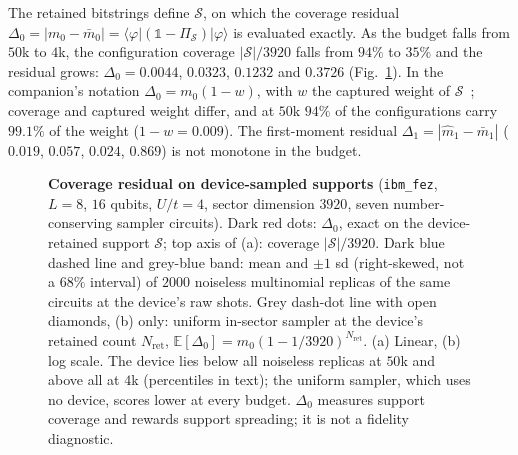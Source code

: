 \documentclass[submission, PhysCore]{SciPost}
\newcommand{\openone}{\mathds{1}}%
\newcommand{\onecolfig}{\setlength{\columnwidth}{0.65\textwidth}}
\begin{document}
The retained bitstrings define $\mathcal S$, on which the coverage residual $\Delta_0=|m_0-\bar m_0|={\langle\varphi|(\openone-\Pi_\mathcal S)|\varphi\rangle}$ is evaluated exactly. As the budget falls from $50$k to $4$k, the configuration coverage $|\mathcal S|/3920$ falls from $94\%$ to $35\%$ and the residual grows: $\Delta_0=0.0044$, $0.0323$, $0.1232$ and $0.3726$ (Fig.~\ref{fig:device}). In the companion's notation $\Delta_0=m_0(1-w)$, with $w$ the captured weight of $\mathcal S$~\cite{SQDspec2608}; coverage and captured weight differ, and at $50$k $94\%$ of the configurations carry $99.1\%$ of the weight ($1-w=0.009$). The first-moment residual $\Delta_1=|\widehat m_1-\bar m_1|$ ($0.019$, $0.057$, $0.024$, $0.869$) is not monotone in the budget.

\begin{figure}[tb]
\centering\onecolfig

\caption{\textbf{Coverage residual on device-sampled supports} (\texttt{ibm\_fez}, $L=8$, $16$ qubits, $U/t=4$, sector dimension $3920$, seven number-conserving sampler circuits). Dark red dots: $\Delta_0$, exact on the device-retained support $\mathcal S$; top axis of (a): coverage $|\mathcal S|/3920$. Dark blue dashed line and grey-blue band: mean and $\pm1$ sd (right-skewed, not a $68\%$ interval) of $2000$ noiseless multinomial replicas of the same circuits at the device's raw shots. Grey dash-dot line with open diamonds, (b) only: uniform in-sector sampler at the device's retained count $N_{\mathrm{ret}}$, $\mathbb{E}[\Delta_0]={m_0(1-1/3920)^{N_{\mathrm{ret}}}}$. (a) Linear, (b) log scale. The device lies below all noiseless replicas at $50$k and above all at $4$k (percentiles in text); the uniform sampler, which uses no device, scores lower at every budget. $\Delta_0$ measures support coverage and rewards support spreading; it is not a fidelity diagnostic.}
\label{fig:device}
\end{figure}
\end{document}
